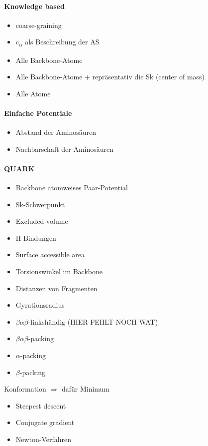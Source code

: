 \paragraph{Knowledge based}
\begin{itemize}
 \item coarse-graining
 \item c\textsubscript{$\alpha$} als Beschreibung der AS
 \item Alle Backbone-Atome
 \item Alle Backbone-Atome + repräsentativ die Sk (center of mass)
 \item Alle Atome
\end{itemize}

\paragraph{Einfache Potentiale}
\begin{itemize}
  \item Abstand der Aminosäuren
  \item Nachbarschaft der Aminosäuren
\end{itemize}

\paragraph{QUARK}
\begin{itemize}
  \item Backbone atomweises Paar-Potential
  \item Sk-Schwerpunkt
  \item Excluded volume
  \item H-Bindungen
  \item Surface accessible area
  \item Torsionswinkel im Backbone
  \item Distanzen von Fragmenten
  \item Gyrationsradius
  \item $\beta \alpha \beta$-linkshändig (HIER FEHLT NOCH WAT)
  \item $\beta \alpha \beta$-packing
  \item $\alpha$-packing
  \item $\beta$-packing
\end{itemize}

Konformation $\Rightarrow$ dafür Minimum
\begin{itemize}
 \item Steepest descent
 \item Conjugate gradient
 \item Newton-Verfahren
\end{itemize}

